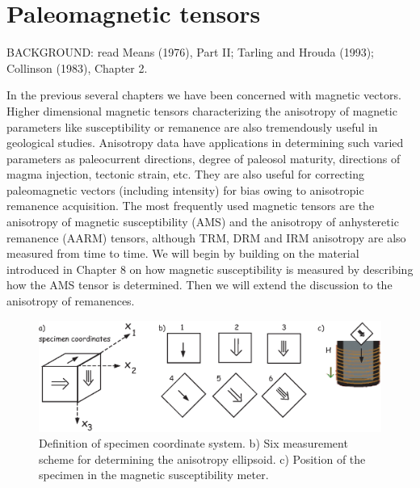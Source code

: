 \chapter{Paleomagnetic tensors}

\noindent
BACKGROUND: 
read  Means (1976), Part II;   \nocite{means76}
Tarling and Hrouda (1993); \nocite{tarling93}
Collinson (1983), Chapter 2. \nocite{collinson83}

\vskip 24pt

In the previous several chapters we have been concerned with magnetic vectors.  Higher dimensional magnetic tensors characterizing the anisotropy of magnetic parameters like susceptibility or remanence are
also tremendously useful in geological studies.   Anisotropy data have applications   
in determining such varied parameters as paleocurrent
directions, degree of paleosol maturity, directions of magma injection, 
 tectonic strain, etc.  They are also useful for correcting paleomagnetic vectors (including intensity) for bias owing to anisotropic remanence acquisition.   
  The most frequently used magnetic tensors are the 
  anisotropy of magnetic susceptibility (AMS) and the anisotropy of 
  anhysteretic remanence (AARM) tensors, although TRM, DRM and IRM anisotropy are also measured from time to time.  We will begin by building on the material introduced in Chapter 8 on how magnetic susceptibility is measured by describing  how the AMS tensor is determined.  Then we will extend the discussion to the anisotropy of remanences.  

\begin{figure}[htb]
\centering  \includegraphics[width=14 cm]{EPSfiles/measAMS.eps}
\caption{Definition of specimen coordinate system.  b) Six measurement scheme for determining the anisotropy ellipsoid.  c) Position of the specimen in the magnetic susceptibility meter. }
\label{fig:measAMS}
\end{figure}


